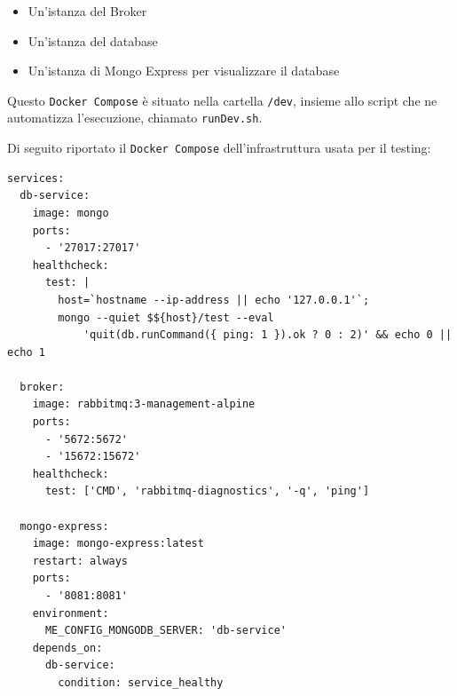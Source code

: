 \begin{itemize}
    \item Un'istanza del Broker

    \item Un'istanza del database

    \item Un'istanza di Mongo Express per visualizzare il database
\end{itemize}

Questo \texttt{Docker Compose} è situato nella cartella \texttt{/dev}, insieme allo script che ne automatizza l'esecuzione, chiamato \texttt{runDev.sh}.

Di seguito riportato il \texttt{Docker Compose} dell'infrastruttura usata per il testing:

\begin{verbatim}
services:
  db-service:
    image: mongo
    ports:
      - '27017:27017'
    healthcheck:
      test: |
        host=`hostname --ip-address || echo '127.0.0.1'`;
        mongo --quiet $${host}/test --eval
            'quit(db.runCommand({ ping: 1 }).ok ? 0 : 2)' && echo 0 || echo 1

  broker:
    image: rabbitmq:3-management-alpine
    ports:
      - '5672:5672'
      - '15672:15672'
    healthcheck:
      test: ['CMD', 'rabbitmq-diagnostics', '-q', 'ping']

  mongo-express:
    image: mongo-express:latest
    restart: always
    ports:
      - '8081:8081'
    environment:
      ME_CONFIG_MONGODB_SERVER: 'db-service'
    depends_on:
      db-service:
        condition: service_healthy

\end{verbatim}
